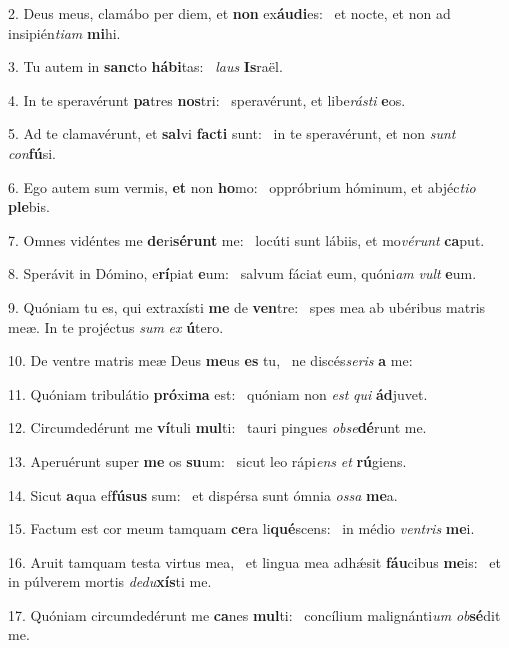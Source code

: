 2. Deus meus, clamábo per diem, et \textbf{non} ex\textbf{áu}\textbf{di}es: \ast\  et nocte, et non ad insipién\textit{ti}\textit{am} \textbf{mi}hi.\

3. Tu autem in \textbf{sanc}to \textbf{há}\textbf{bi}tas: \ast\  \textit{laus} \textbf{Is}raël.\

4. In te speravérunt \textbf{pa}tres \textbf{nos}tri: \ast\  speravérunt, et libe\textit{rás}\textit{ti} \textbf{e}os.\

5. Ad te clamavérunt, et \textbf{sal}vi \textbf{fac}\textbf{ti} sunt: \ast\  in te speravérunt, et non \textit{sunt} \textit{con}\textbf{fú}si.\

6. Ego autem sum vermis, \textbf{et} non \textbf{ho}mo: \ast\  oppróbrium hóminum, et abjéc\textit{ti}\textit{o} \textbf{ple}bis.\

7. Omnes vidéntes me \textbf{de}ri\textbf{sé}\textbf{runt} me: \ast\  locúti sunt lábiis, et mo\textit{vé}\textit{runt} \textbf{ca}put.\

8. Sperávit in Dómino, e\textbf{rí}piat \textbf{e}um: \ast\  salvum fáciat eum, quóni\textit{am} \textit{vult} \textbf{e}um.\

9. Quóniam tu es, qui extraxísti \textbf{me} de \textbf{ven}tre: \ast\  spes mea ab ubéribus matris meæ. In te projéctus \textit{sum} \textit{ex} \textbf{ú}tero.\

10. De ventre matris meæ Deus \textbf{me}us \textbf{es} tu, \ast\  ne discés\textit{se}\textit{ris} \textbf{a} me:\

11. Quóniam tribulátio \textbf{pró}xi\textbf{ma} est: \ast\  quóniam non \textit{est} \textit{qui} \textbf{ád}juvet.\

12. Circumdedérunt me \textbf{ví}tuli \textbf{mul}ti: \ast\  tauri pingues \textit{ob}\textit{se}\textbf{dé}runt me.\

13. Aperuérunt super \textbf{me} os \textbf{su}um: \ast\  sicut leo rápi\textit{ens} \textit{et} \textbf{rú}giens.\

14. Sicut \textbf{a}qua ef\textbf{fú}\textbf{sus} sum: \ast\  et dispérsa sunt ómnia \textit{os}\textit{sa} \textbf{me}a.\

15. Factum est cor meum tamquam \textbf{ce}ra li\textbf{qué}scens: \ast\  in médio \textit{ven}\textit{tris} \textbf{me}i.\

16. Aruit tamquam testa virtus mea, \dag\  et lingua mea adhǽsit \textbf{fáu}cibus \textbf{me}is: \ast\  et in púlverem mortis \textit{de}\textit{du}\textbf{xís}ti me.\

17. Quóniam circumdedérunt me \textbf{ca}nes \textbf{mul}ti: \ast\  concílium malignánti\textit{um} \textit{ob}\textbf{sé}dit me.\


